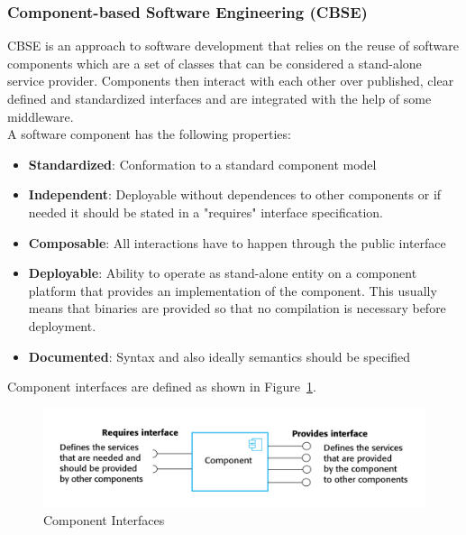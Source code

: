 \subsubsection{Component-based Software Engineering (CBSE)}
CBSE is an approach to software development that relies on the reuse of software components which are a set of classes that can be considered a stand-alone service provider.
Components then interact with each other over published, clear defined and standardized interfaces and are integrated with the help of some middleware.\\
A software component has the following properties:
\begin{itemize}
  \item \textbf{Standardized}: Conformation to a standard component model
  \item \textbf{Independent}: Deployable without dependences to other components or if needed it should be stated in a "requires" interface specification.
  \item \textbf{Composable}: All interactions have to happen through the public interface
  \item \textbf{Deployable}: Ability to operate as stand-alone entity on a component platform that provides an implementation of the component. This usually means that binaries are provided so that no compilation is necessary before deployment.
  \item \textbf{Documented}: Syntax and also ideally semantics should be specified
\end{itemize}

Component interfaces are defined as shown in Figure~\ref{fig:component_interfaces}.\\
\begin{figure}[h]
  \centering
  \includegraphics[width=.8\textwidth]{images/component_interfaces.png}
  \caption{Component Interfaces}\label{fig:component_interfaces}
\end{figure}

